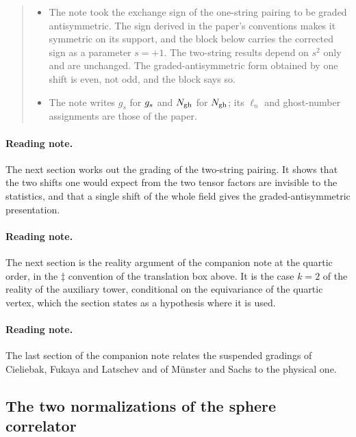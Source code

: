 \begin{quote}
\begin{itemize}
    \item The note took the exchange sign of the one-string pairing to be graded antisymmetric.
      The sign derived in the paper's conventions makes it symmetric on its support, and the block below carries the corrected sign as a parameter $s = +1$.
      The two-string results depend on $s^2$ only and are unchanged.
      The graded-antisymmetric form obtained by one shift is even, not odd, and the block says so.

    \item The note writes $g_s$ for $g_s$ and $N_{\rm gh}$ for $N_{\text{gh}}$; its $\ell_n$ and ghost-number assignments are those of the paper.
  \end{itemize}
\end{quote}



\paragraph*{Reading note.}
The next section works out the grading of the two-string pairing.
It shows that the two shifts one would expect from the two tensor factors are invisible to the statistics, and that a single shift of the whole field gives the graded-antisymmetric presentation.



\paragraph*{Reading note.}
 The next section is the reality argument of the companion note at the quartic order, in the $\ddagger$ convention of the translation box above.
It is the case $k = 2$ of the reality of the auxiliary tower, conditional on the equivariance of the quartic vertex, which the section states as a hypothesis where it is used.



\paragraph*{Reading note.}
The last section of the companion note relates the suspended gradings of Cieliebak, Fukaya and Latschev and of Münster and Sachs to the physical one.




\subsection{The two normalizations of the sphere correlator}
\label{sec:conv:two-normalizations}

